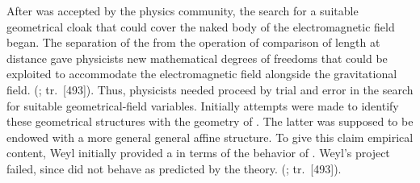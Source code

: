 \documentclass[draft]{article}
\newcommand{\phin}{\ensuremath{\varphi_\nu}\xspace}
\renewcommand{\rzlap}[2]{(\cite[#1]{Reichenbach1928}; tr.\ [#2])\xspace}
\begin{document}
After \gr was accepted by the physics community, the search for a suitable geometrical cloak that could cover the naked body of the electromagnetic field began. The separation of the  \Gtmn from the operation of comparison of length at distance \gmn gave physicists new mathematical degrees of freedoms that could be exploited to accommodate the electromagnetic field alongside the gravitational field.  \rzlap{354}{493}. Thus, physicists needed proceed by trial and error in the search for suitable geometrical-field variables. Initially attempts were made to identify these geometrical structures with  the geometry of \spti. The latter was supposed to be endowed with a more general general affine structure. To give this claim empirical content, Weyl initially provided a  in terms of the behavior of \rac. Weyl's project failed, since \rac did not behave as predicted by the theory.   \rzlap{353}{493}.


\end{document}
